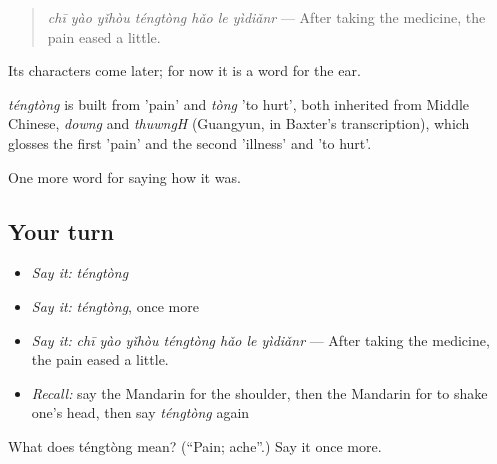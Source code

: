 \begin{quote}
\emph{chī yào yǐhòu téngtòng hǎo le yìdiǎnr} — After taking the medicine, the pain eased a little.
\end{quote}

Its characters come later; for now it is a word for the ear.

\begin{cousinweb}
\emph{téngtòng} is built from  'pain' and \emph{tòng} 'to hurt', both inherited from Middle Chinese, \emph{downg} and \emph{thuwngH} (Guangyun, in Baxter's transcription), which glosses the first 'pain' and the second 'illness' and 'to hurt'.
\end{cousinweb}

\begin{grammarlens}[title={What you've built}]
One more word for saying how it was.
\end{grammarlens}

\subsection*{Your turn}
\begin{itemize}
\raggedright
  \item \emph{Say it:} \emph{téngtòng}
  \item \emph{Say it:} \emph{téngtòng}, once more
  \item \emph{Say it:} \emph{chī yào yǐhòu téngtòng hǎo le yìdiǎnr} — After taking the medicine, the pain eased a little.
  \item \emph{Recall:} say the Mandarin for the shoulder, then the Mandarin for to shake one's head, then say \emph{téngtòng} again
\end{itemize}

\begin{tcolorbox}[breakable,colback=teal!4,colframe=teal!35!black,title={Before you move on}]
What does téngtòng mean? (\textquotedblleft{}Pain; ache\textquotedblright{}.) Say it once more.
\end{tcolorbox}
